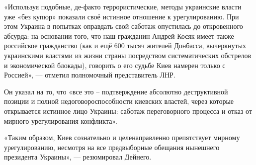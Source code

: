 «Используя подобные, де-факто террористические, методы украинские власти уже
«без купюр» показали своё истинное отношение к урегулированию. При этом Украина
в попытках оправдать свой саботаж опустилась до откровенного абсурда: на
основании того, что наш гражданин Андрей Косяк имеет также российское
гражданство (как и ещё 600 тысяч жителей Донбасса, вычеркнутых украинскими
властями из жизни страны посредством систематических обстрелов и экономической
блокады), говорить о его судьбе Киев намерен только с Россией», — отметил
полномочный представитель ЛНР.

Он указал на то, что «все это – подтверждение абсолютно деструктивной позиции и
полной недоговороспособности киевских властей, через которые открывается
истинное лицо Украины: саботаж переговорного процесса и отказ от мирного
урегулирования конфликта».

«Таким образом, Киев сознательно и целенаправленно препятствует мирному
урегулированию, несмотря на все предвыборные обещания нынешнего президента
Украины», — резюмировал Дейнего.

